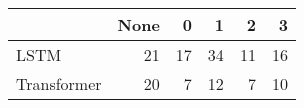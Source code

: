 \begin{tabular}{lrrrrr}
\toprule
{} &  None &   0 &   1 &   2 &   3 \\
\midrule
LSTM        &    21 &  17 &  34 &  11 &  16 \\
Transformer &    20 &   7 &  12 &   7 &  10 \\
\bottomrule
\end{tabular}
